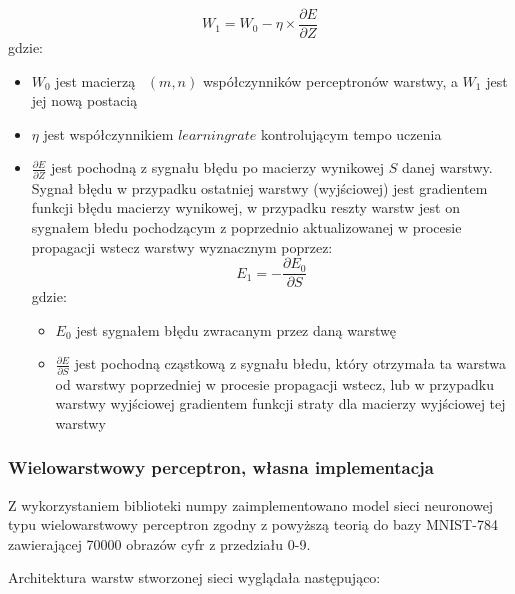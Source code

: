 \documentclass{article}
\begin{document}
\begin{equation}
    W_1 = W_0 - \eta \times \frac{\partial E}{\partial Z}
\end{equation}
gdzie:
\begin{itemize}
    \item $W_0$ jest macierzą ~$(m, n)$ współczynników perceptronów warstwy, a $W_1$ jest jej nową postacią
    \item $\eta$ jest współczynnikiem $learning rate$ kontrolującym tempo uczenia
    \item $\frac{\partial E}{\partial Z}$ jest pochodną z sygnału błędu po 
    macierzy wynikowej $S$ danej warstwy. Sygnał błędu w przypadku ostatniej warstwy (wyjściowej) jest
    gradientem funkcji błędu macierzy wynikowej, w przypadku reszty warstw 
    jest on sygnałem błedu pochodzącym z poprzednio aktualizowanej w procesie propagacji wstecz warstwy
    wyznacznym poprzez:
    \begin{equation}
        E_1 = -\frac{\partial E_0}{\partial S}
    \end{equation}
    gdzie:
    \begin{itemize}
        \item $E_0$ jest sygnałem błędu zwracanym przez daną warstwę
        \item $\frac{\partial E}{\partial S}$ jest pochodną cząstkową z sygnału błedu, 
        który otrzymała ta warstwa od warstwy poprzedniej w procesie propagacji wstecz, lub w przypadku warstwy
        wyjściowej gradientem funkcji straty dla macierzy wyjściowej tej warstwy
    \end{itemize}
\end{itemize}


\subsubsection{Wielowarstwowy perceptron, własna implementacja}

Z wykorzystaniem biblioteki numpy zaimplementowano model sieci neuronowej 
typu wielowarstwowy perceptron zgodny z powyższą teorią do bazy MNIST-784 zawierającej 70000 obrazów cyfr z przedziału 0-9.


Architektura warstw stworzonej sieci wyglądała następująco:

\end{document}
